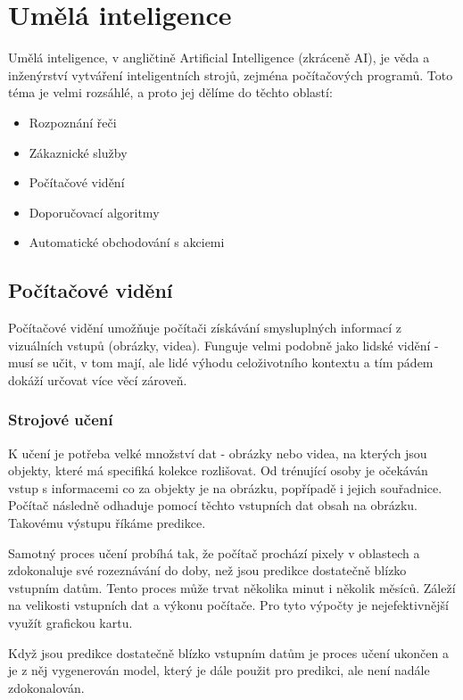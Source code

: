 \section{Umělá inteligence}
Umělá inteligence, v angličtině Artificial Intelligence (zkráceně AI), je věda a inženýrství vytváření inteligentních strojů, zejména počítačových programů.\cite{What-is-AI} Toto téma je velmi rozsáhlé, a proto jej dělíme do těchto oblastí\cite{IBM-AI}:
\begin{itemize}
	\item Rozpoznání řeči
	\item Zákaznické služby
	\item Počítačové vidění
	\item Doporučovací algoritmy
	\item Automatické obchodování s akciemi
\end{itemize}

\subsection{Počítačové vidění}
Počítačové vidění umožňuje počítači získávání smysluplných informací z vizuálních vstupů (obrázky, videa). \cite{IBM-CV} Funguje velmi podobně jako lidské vidění - musí se učit, v tom mají, ale lidé výhodu celoživotního kontextu a tím pádem dokáží určovat více věcí zároveň.\par

\subsubsection{Strojové učení}
K učení je potřeba velké množství dat - obrázky nebo videa, na kterých jsou objekty, které má specifiká kolekce rozlišovat. Od trénující osoby je očekáván vstup s informacemi co za objekty je na obrázku, popřípadě i jejich souřadnice. Počítač následně odhaduje pomocí těchto vstupních dat obsah na obrázku. Takovému výstupu říkáme predikce.\par
Samotný proces učení probíhá tak, že počítač prochází pixely v oblastech a zdokonaluje své rozeznávání do doby, než jsou predikce dostatečně blízko vstupním datům. Tento proces může trvat několika minut i několik měsíců. Záleží na velikosti vstupních dat a výkonu počítače. Pro tyto výpočty je nejefektivnější využít grafickou kartu.\par
Když jsou predikce dostatečně blízko vstupním datům je proces učení ukončen a je z něj vygenerován model, který je dále použit pro predikci, ale není nadále zdokonalován. 

